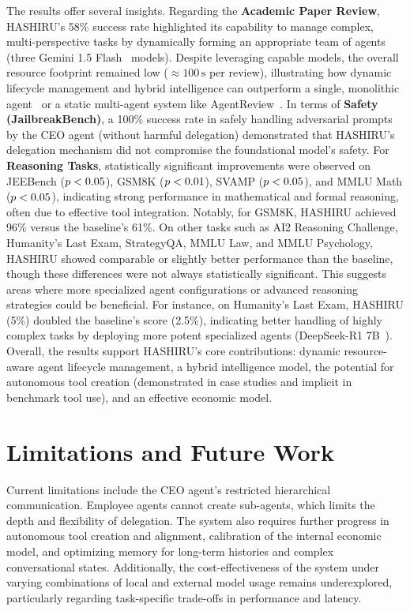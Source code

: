 \documentclass[twocolumn]{article}
\newcommand{\lt}{\ensuremath <} %
\begin{document}
The results offer several insights. Regarding the \textbf{Academic Paper Review}, HASHIRU's 58\% success rate highlighted its capability to manage complex, multi-perspective tasks by dynamically forming an appropriate team of agents (three Gemini 1.5 Flash~\cite{gemini15flash} models). Despite leveraging capable models, the overall resource footprint remained low (\(\approx 100\,\mathrm{s}\) per review), illustrating how dynamic lifecycle management and hybrid intelligence can outperform a single, monolithic agent~\cite{zhou2024llm} or a static multi-agent system like AgentReview~\cite{jin2024agentreviewexploringpeerreview}.
 In terms of \textbf{Safety (JailbreakBench)}, a 100\% success rate in safely handling adversarial prompts by the CEO agent (without harmful delegation) demonstrated that HASHIRU's delegation mechanism did not compromise the foundational model's safety.
For \textbf{Reasoning Tasks}, statistically significant improvements were observed on JEEBench ($p \lt 0.05$), GSM8K ($p \lt 0.01$), SVAMP ($p \lt 0.05$), and MMLU Math ($p \lt 0.05$), indicating strong performance in mathematical and formal reasoning, often due to effective tool integration. Notably, for GSM8K, HASHIRU achieved 96\% versus the baseline's 61\%. On other tasks such as AI2 Reasoning Challenge, Humanity's Last Exam, StrategyQA, MMLU Law, and MMLU Psychology, HASHIRU showed comparable or slightly better performance than the baseline, though these differences were not always statistically significant. This suggests areas where more specialized agent configurations or advanced reasoning strategies could be beneficial. For instance, on Humanity's Last Exam, HASHIRU (5\%) doubled the baseline's score (2.5\%), indicating better handling of highly complex tasks by deploying more potent specialized agents (DeepSeek-R1 7B~\cite{deepseekr1_report}).
Overall, the results support HASHIRU's core contributions: dynamic resource-aware agent lifecycle management, a hybrid intelligence model, the potential for autonomous tool creation (demonstrated in case studies and implicit in benchmark tool use), and an effective economic model.

\section{Limitations and Future Work}
\label{sec:tech_limitations_future_work}

Current limitations include the CEO agent's restricted hierarchical communication. Employee agents cannot create sub-agents, which limits the depth and flexibility of delegation. The system also requires further progress in autonomous tool creation and alignment, calibration of the internal economic model, and optimizing memory for long-term histories and complex conversational states. Additionally, the cost-effectiveness of the system under varying combinations of local and external model usage remains underexplored, particularly regarding task-specific trade-offs in performance and latency.
\end{document}
